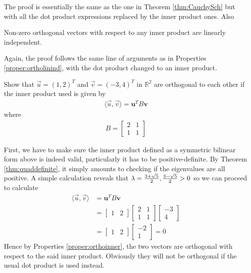 The proof is essentially the same as the one in Theorem \ref{thm:CauchySch} but with all the dot product expressions replaced by the inner product ones. Also
\begin{proper}
Non-zero orthogonal vectors with respect to any inner product are linearly independent.
\end{proper}
Again, the proof follows the same line of arguments as in Properties \ref{proper:ortholinind}, with the dot product changed to an inner product.

\begin{exmp}
Show that $\vec{u} = (1,2)^T$ and $\vec{v} = (-3,4)^T$ in $\mathbb{R}^2$ are orthogonal to each other if the inner product used is given by
\begin{align*}
\langle\vec{u}, \vec{v}\rangle = \textbf{u}^TB\textbf{v}
\end{align*}
where 
\begin{align*}
B = 
\begin{bmatrix}
2 & 1 \\
1 & 1
\end{bmatrix}
\end{align*}
\end{exmp}
\begin{solution}
First, we have to make sure the inner product defined as a symmetric bilinear form above is indeed valid, particularly it has to be positive-definite. By Theorem \ref{thm:quaddefinite}, it simply amounts to checking if the eigenvalues are all positive. A simple calculation reveals that $\lambda = \smash{\frac{3+\sqrt{5}}{2}, \frac{3-\sqrt{5}}{2}} > 0$ so we can proceed to calculate
\begin{align*}
\langle\vec{u}, \vec{v}\rangle &= \textbf{u}^TB\textbf{v} \\
&= \begin{bmatrix}
1 & 2
\end{bmatrix}
\begin{bmatrix}
2 & 1 \\
1 & 1
\end{bmatrix}
\begin{bmatrix}
-3 \\
4
\end{bmatrix} \\
&= \begin{bmatrix}
1 & 2
\end{bmatrix}
\begin{bmatrix}
-2 \\
1
\end{bmatrix} = 0
\end{align*}
Hence by Properties \ref{proper:orthoinner}, the two vectors are orthogonal with respect to the said inner product. Obviously they will not be orthogonal if the usual dot product is used instead.
\end{solution}


